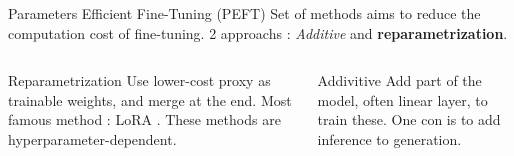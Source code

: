 \begin{frame}{Parameters Efficient Fine-Tuning (PEFT)}
    Set of methods aims to reduce the computation cost of fine-tuning. 2 approachs : \textit{Additive} and \textbf{reparametrization}.
    


    
    \begin{columns}  
  
        \begin{column}[t]{0.45\textwidth}
        \begin{block}{Reparametrization}
            Use lower-cost proxy as trainable weights, and merge at the end. Most famous method : LoRA \cite{hu2021loralowrankadaptationlarge}. These methods are hyperparameter-dependent.
        \end{block}
        \end{column}
    
        \begin{column}[t]{0.45\textwidth}
        \begin{block}{Addivitive}
            Add part of the model, often linear layer, to train these.  One con is to add inference to generation.
            
        \end{block}
        \end{column}
      
    \end{columns}

\end{frame}



